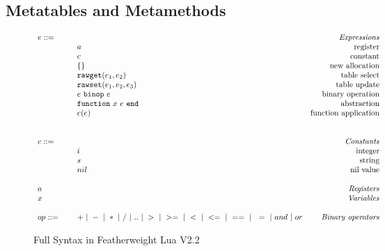\documentclass{article}
\begin{document}
\subsection{Metatables and Metamethods}

\begin{figure}
\caption{Full Syntax in Featherweight Lua V2.2}
\label{fig:FW2Syx}
\[
  \begin{array}{llr}
  \mydefhead{e ::=\qquad\qquad\qquad\qquad}{Expressions}
  \mydefcase{a}{register}
  \mydefcase{c}{constant}
  \mydefcase{\{\}}{new allocation}
  \mydefcase{{\tt rawget}(e_1,e_2)}{table select}
  \mydefcase{{\tt rawset}(e_1,e_2,e_3)}{table update}
  \mydefcase{e ~{\tt binop}~ e}{binary operation}
  \mydefcase{\abFunction x e}{abstraction}
  \mydefcase{e(e)}{function application}
  \\
  \\
  \mydefhead{c ::=\qquad\qquad\qquad\qquad}{Constants}
  \mydefcase{i}{integer}
  \mydefcase{s}{string}
  \mydefcase{nil}{nil value}
  \\
  \mydefhead{a \qquad\qquad\qquad\qquad}{Registers}
  \mydefhead{x \qquad\qquad\qquad\qquad}{Variables}
  \\
  op ::= & + ~|~ - ~|~ * ~|~ / ~|~ .. ~|~ > ~|~ >= ~|~ < ~|~ <= ~|~ == ~|~ ~= ~|~ and ~|~ or & \mbox{\emph{Binary operators}} \\
\end{array}
\]
\end{figure}

\end{document}
